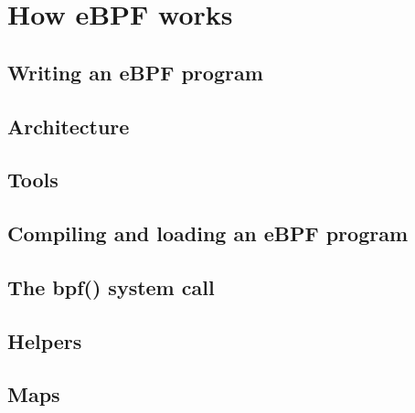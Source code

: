 \chapter{How eBPF works}

%
%
%
%
%
%

\section{Writing an eBPF program}

\section{Architecture}

\section{Tools}

\section{Compiling and loading an eBPF program}

\section{The bpf() system call}

\section{Helpers}

\section{Maps}
